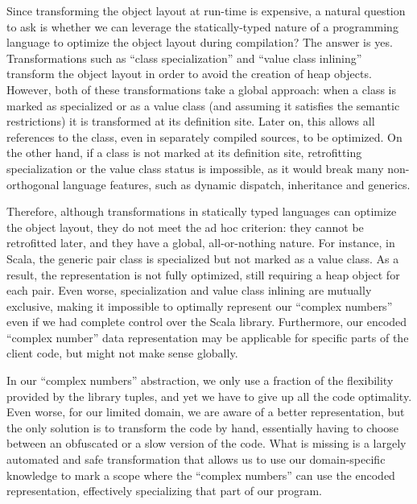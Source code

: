 
Since transforming the object layout at run-time is expensive, a
natural question to ask is whether we can leverage the
statically-typed nature of a programming language to optimize the
object layout during compilation? The answer is yes. Transformations such as ``class
specialization'' and ``value class inlining'' transform the object
layout in order to avoid the creation of heap objects. However, both
of these transformations take a global approach: when a class is
marked as specialized or as a value class (and assuming it satisfies the
semantic restrictions) it is transformed at its definition site. Later
on, this allows all references to the class, even in separately
compiled sources, to be optimized. On the other hand,
if a class is not marked at its definition site, retrofitting
specialization or the value class status is impossible, as it would
break many non-orthogonal language features, such as dynamic dispatch,
inheritance and generics.

Therefore, although transformations in statically typed languages can
optimize the object layout, they do not meet the ad hoc criterion:
they cannot be retrofitted later, and they have a global, all-or-nothing
nature. For instance, in Scala, the generic pair class is specialized
but not marked as a value class. As a result, the representation is
not fully optimized, still requiring a heap object for each pair. Even
worse, specialization and value class inlining are mutually exclusive,
making it impossible to optimally represent our ``complex numbers''
even if we had complete control over the Scala library.
Furthermore, our encoded ``complex number'' data representation may be applicable for
specific parts of the client code, but might not make sense globally.

In our ``complex numbers'' abstraction, we only
use a fraction of the flexibility provided by the library tuples, and
yet we have to give up all the code optimality. Even worse, for our
limited domain, we are aware of a better representation, but
the only solution is to transform the code by hand, essentially having
to choose between an obfuscated or a slow version of the code. What is
missing is a largely automated and safe transformation that allows us
to use our domain-specific knowledge to mark a scope where the
``complex numbers'' can use the encoded representation, effectively
specializing that part of our program.

